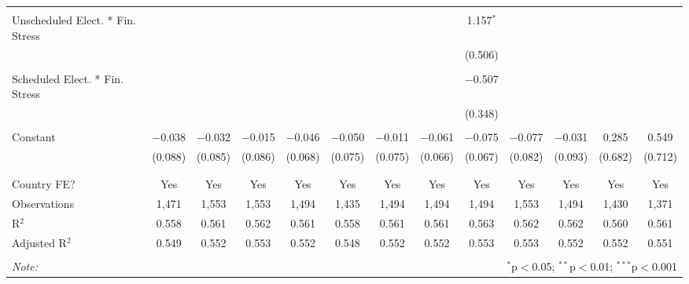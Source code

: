 \begin{table}[!htbp]
\begin{tabular}{@{\extracolsep{5pt}}lcccccccccccc}
  & & & & & & & & & & & & \\ 
 Unscheduled Elect. * Fin. Stress &  &  &  &  &  &  &  & 1.157$^{*}$ &  &  &  &  \\ 
  &  &  &  &  &  &  &  & (0.506) &  &  &  &  \\ 
  & & & & & & & & & & & & \\ 
 Scheduled Elect. * Fin. Stress &  &  &  &  &  &  &  & $-$0.507 &  &  &  &  \\ 
  &  &  &  &  &  &  &  & (0.348) &  &  &  &  \\ 
  & & & & & & & & & & & & \\ 
 Constant & $-$0.038 & $-$0.032 & $-$0.015 & $-$0.046 & $-$0.050 & $-$0.011 & $-$0.061 & $-$0.075 & $-$0.077 & $-$0.031 & 0.285 & 0.549 \\ 
  & (0.088) & (0.085) & (0.086) & (0.068) & (0.075) & (0.075) & (0.066) & (0.067) & (0.082) & (0.093) & (0.682) & (0.712) \\ 
  & & & & & & & & & & & & \\ 
\hline \\[-1.8ex] 
Country FE? & Yes & Yes & Yes & Yes & Yes & Yes & Yes & Yes & Yes & Yes & Yes & Yes \\ 
Observations & 1,471 & 1,553 & 1,553 & 1,494 & 1,435 & 1,494 & 1,494 & 1,494 & 1,553 & 1,494 & 1,430 & 1,371 \\ 
R$^{2}$ & 0.558 & 0.561 & 0.562 & 0.561 & 0.558 & 0.561 & 0.561 & 0.563 & 0.562 & 0.562 & 0.560 & 0.561 \\ 
Adjusted R$^{2}$ & 0.549 & 0.552 & 0.553 & 0.552 & 0.548 & 0.552 & 0.552 & 0.553 & 0.553 & 0.552 & 0.552 & 0.551 \\ 
\hline 
\hline \\[-1.8ex] 
\textit{Note:}  & \multicolumn{12}{r}{$^{*}$p$<$0.05; $^{**}$p$<$0.01; $^{***}$p$<$0.001} \\ 
\end{tabular} 
\end{table} 
